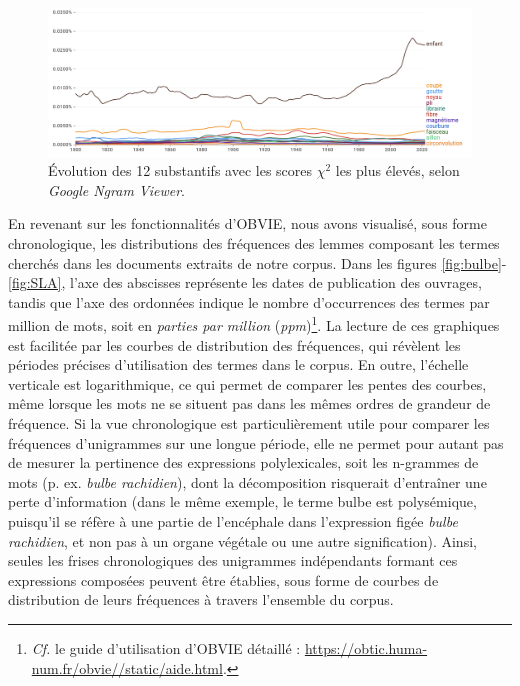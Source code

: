 \begin{figure}[h]
	\centering
	\includegraphics[width=1\textwidth]{img/chi2_google_ngram.png}
	\caption{Évolution des 12 substantifs avec les scores $\chi^2$ les plus élevés, selon \textit{Google Ngram Viewer}.}
	\label{fig:chi2_google_ngram}
\end{figure}



En revenant sur les fonctionnalités d'\textsc{OBVIE}, nous avons visualisé, sous forme chronologique, les distributions des fréquences des lemmes composant les termes cherchés dans les documents extraits de notre corpus. Dans les figures \ref{fig:bulbe}-\ref{fig:SLA}, l'axe des abscisses représente les dates de publication des ouvrages, tandis que l'axe des ordonnées indique le nombre d'occurrences des termes par million de mots, soit en \textit{parties par million} (\textit{ppm})\footnote{\textit{Cf.} le guide d'utilisation d'\textsc{OBVIE} détaillé : \url{https://obtic.huma-num.fr/obvie//static/aide.html}.}. La lecture de ces graphiques est facilitée par les courbes de distribution des fréquences, qui révèlent les périodes précises d'utilisation des termes dans le corpus. En outre, l'échelle verticale est logarithmique, ce qui permet de comparer les pentes des courbes, même lorsque les mots ne se situent pas dans les mêmes ordres de grandeur de fréquence. Si la vue chronologique est particulièrement utile pour comparer les fréquences d'unigrammes sur une longue période, elle ne permet pour autant pas de mesurer la pertinence des expressions polylexicales, soit les n-grammes de mots (p. ex. \textit{bulbe rachidien}), dont la décomposition risquerait d'entraîner une perte d'information (dans le même exemple, le terme \og{}bulbe\fg{} est polysémique, puisqu'il se réfère à une partie de l'encéphale  dans l'expression figée \textit{bulbe rachidien}, et non pas à un organe végétale ou une autre signification). Ainsi, seules les frises chronologiques des unigrammes indépendants formant ces expressions composées peuvent être établies, sous forme de courbes de distribution de leurs fréquences à travers l'ensemble du corpus.

